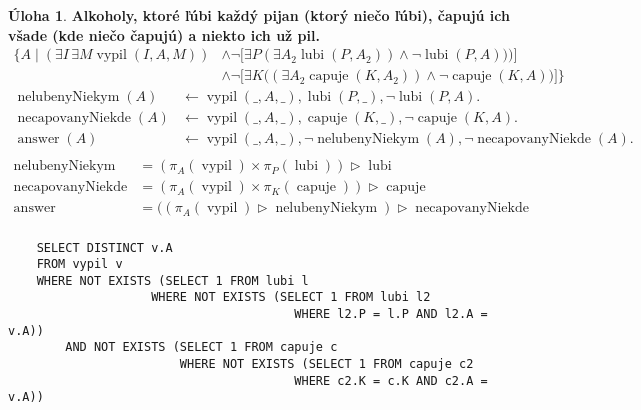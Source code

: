 \documentclass[10pt, a4paper]{article}
\theoremstyle{definition}
\newtheorem{problem}{Úloha}[section]
\DeclareMathOperator{\antijoin}{\rhd}
\DeclareMathOperator{\lubi}{lubi}
\DeclareMathOperator{\capuje}{capuje}
\DeclareMathOperator{\vypil}{vypil}
\DeclareMathOperator{\answer}{answer}
\begin{document}
\begin{problem}
{\bf Alkoholy, ktoré ľúbi každý pijan (ktorý niečo ľúbi), čapujú ich všade (kde niečo čapujú) a niekto ich už pil.}
\begin{align*}
\Big\{A\mid (\exists I\,\exists M\vypil(I, A, M))&\land \lnot \Big[\exists P (\exists A_2\lubi(P, A_2))\land\lnot\lubi(P, A))\Big)\Big]\\
&\land \lnot\Big[\exists K \Big((\exists A_2 \capuje(K, A_2))\land \lnot\capuje(K, A)\Big)\Big]\Big\}
\end{align*}
\begin{align*}
\operatorname{nelubenyNiekym}(A) &\leftarrow \vypil(\_, A, \_), \lubi(P, \_), \lnot\lubi(P, A).\\
\operatorname{necapovanyNiekde}(A) &\leftarrow \vypil(\_, A, \_), \capuje(K, \_), \lnot\capuje(K, A).\\
\answer(A) &\leftarrow \vypil(\_, A, \_), \lnot\operatorname{nelubenyNiekym}(A), \lnot\operatorname{necapovanyNiekde}(A).\\
\end{align*}
\begin{align*}
\operatorname{nelubenyNiekym} & = (\pi_A(\vypil)\times \pi_P(\lubi))\antijoin \lubi\\
\operatorname{necapovanyNiekde} & = (\pi_A(\vypil)\times \pi_K(\capuje))\antijoin \capuje\\
\answer & = ((\pi_A(\vypil) \antijoin \operatorname{nelubenyNiekym})\antijoin \operatorname{necapovanyNiekde}\\
\end{align*}
{\small
\begin{verbatim}
    SELECT DISTINCT v.A
    FROM vypil v
    WHERE NOT EXISTS (SELECT 1 FROM lubi l
                    WHERE NOT EXISTS (SELECT 1 FROM lubi l2
                                        WHERE l2.P = l.P AND l2.A = v.A))
        AND NOT EXISTS (SELECT 1 FROM capuje c
                        WHERE NOT EXISTS (SELECT 1 FROM capuje c2
                                        WHERE c2.K = c.K AND c2.A = v.A))
\end{verbatim}
}
\end{problem}
\end{document}
